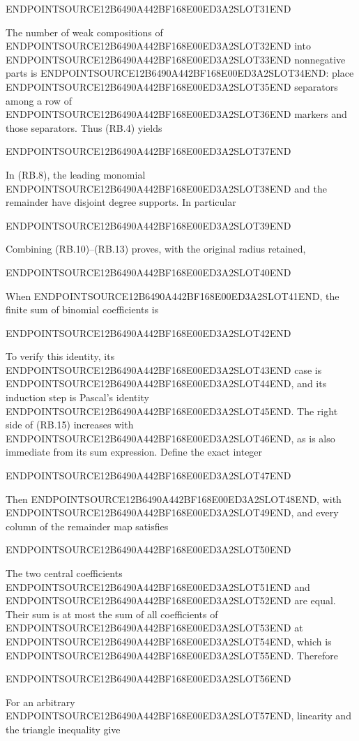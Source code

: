 ENDPOINTSOURCE12B6490A442BF168E00ED3A2SLOT31END

The number of weak compositions of ENDPOINTSOURCE12B6490A442BF168E00ED3A2SLOT32END into ENDPOINTSOURCE12B6490A442BF168E00ED3A2SLOT33END nonnegative parts is ENDPOINTSOURCE12B6490A442BF168E00ED3A2SLOT34END: place ENDPOINTSOURCE12B6490A442BF168E00ED3A2SLOT35END separators among a row of ENDPOINTSOURCE12B6490A442BF168E00ED3A2SLOT36END markers and those separators. Thus (RB.4) yields

ENDPOINTSOURCE12B6490A442BF168E00ED3A2SLOT37END

In (RB.8), the leading monomial ENDPOINTSOURCE12B6490A442BF168E00ED3A2SLOT38END and the remainder have disjoint degree supports. In particular

ENDPOINTSOURCE12B6490A442BF168E00ED3A2SLOT39END

Combining (RB.10)--(RB.13) proves, with the original radius retained,

ENDPOINTSOURCE12B6490A442BF168E00ED3A2SLOT40END

When ENDPOINTSOURCE12B6490A442BF168E00ED3A2SLOT41END, the finite sum of binomial coefficients is

ENDPOINTSOURCE12B6490A442BF168E00ED3A2SLOT42END

To verify this identity, its ENDPOINTSOURCE12B6490A442BF168E00ED3A2SLOT43END case is ENDPOINTSOURCE12B6490A442BF168E00ED3A2SLOT44END, and its induction step is Pascal's identity ENDPOINTSOURCE12B6490A442BF168E00ED3A2SLOT45END. The right side of (RB.15) increases with ENDPOINTSOURCE12B6490A442BF168E00ED3A2SLOT46END, as is also immediate from its sum expression. Define the exact integer

ENDPOINTSOURCE12B6490A442BF168E00ED3A2SLOT47END

Then ENDPOINTSOURCE12B6490A442BF168E00ED3A2SLOT48END, with ENDPOINTSOURCE12B6490A442BF168E00ED3A2SLOT49END, and every column of the remainder map satisfies

ENDPOINTSOURCE12B6490A442BF168E00ED3A2SLOT50END

The two central coefficients ENDPOINTSOURCE12B6490A442BF168E00ED3A2SLOT51END and ENDPOINTSOURCE12B6490A442BF168E00ED3A2SLOT52END are equal. Their sum is at most the sum of all coefficients of ENDPOINTSOURCE12B6490A442BF168E00ED3A2SLOT53END at ENDPOINTSOURCE12B6490A442BF168E00ED3A2SLOT54END, which is ENDPOINTSOURCE12B6490A442BF168E00ED3A2SLOT55END. Therefore

ENDPOINTSOURCE12B6490A442BF168E00ED3A2SLOT56END

For an arbitrary ENDPOINTSOURCE12B6490A442BF168E00ED3A2SLOT57END, linearity and the triangle inequality give

